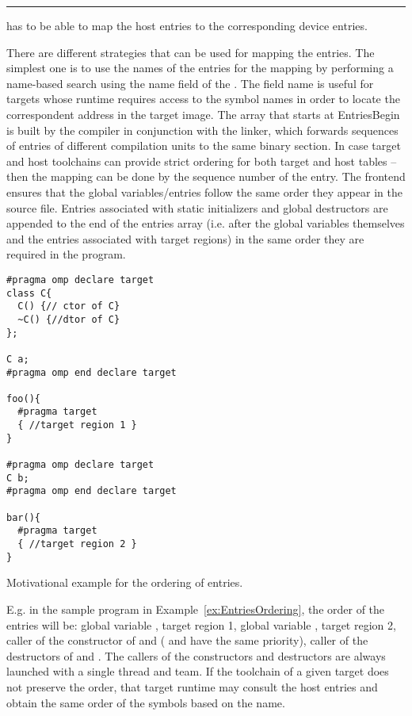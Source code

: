 \noindent\rule{\textwidth}{0.4pt}

\libomptarget{} has to be able to map the host entries to the corresponding device entries.

There are different strategies that can be used for mapping the entries. The simplest one is to use the names of the entries for the mapping by performing a name-based search using the name field of the . The field name is useful for targets whose runtime requires access to the symbol names in order to locate the correspondent address in the target image. The array that starts at EntriesBegin is built by the compiler in conjunction with the linker, which forwards sequences of entries of different compilation units to the same binary section. In case target and host toolchains can provide strict ordering for both target and host tables – then the mapping can be done by the sequence number of the entry. The frontend ensures that the global variables/entries follow the same order they appear in the source file. Entries associated with static initializers and global destructors are appended to the end of the entries array (i.e. after the global variables themselves and the entries associated with target regions) in the same order they are required in the program. 

\begin{example}
\lstset{basicstyle=\scriptsize,frame=single}
\begin{lstlisting}
#pragma omp declare target
class C{
  C() {// ctor of C}
  ~C() {//dtor of C}
};

C a;
#pragma omp end declare target

foo(){
  #pragma target
  { //target region 1 }
}

#pragma omp declare target
C b;
#pragma omp end declare target

bar(){
  #pragma target
  { //target region 2 }
}
\end{lstlisting}
\lstset{basicstyle=\small\bfseries,frame=none}
\caption{Motivational example for the ordering of entries.}
\label{ex:EntriesOrdering}
\end{example}
%
E.g. in the sample program in Example~\ref{ex:EntriesOrdering}, the order of the entries will be: global variable , target region 1, global variable , target region 2, caller of the constructor of  and  ( and  have the same priority), caller of the destructors of  and . The callers of the constructors and destructors are always launched with a single thread and team. If the toolchain of a given target does not preserve the order, that target runtime may consult the host entries and obtain the same order of the symbols based on the name.

